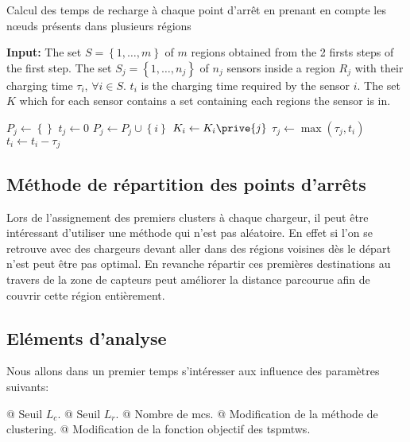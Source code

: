 \documentclass[final]{polytech/polytech}
\begin{document}
			\begin{algorithm}[H]
				\caption{Calcul des temps de recharge à chaque point d'arrêt en prenant en compte les n\oe uds présents dans plusieurs régions}
  				\label{alg:algorithm1}
  				\hspace*{\algorithmicindent} \textbf{Input:}
  				The set $S=\left\{1,\dots, m\right\}$ of $m$ regions obtained from the 2 firsts steps of the first step. The set $S_j=\left\{1,\dots ,n_j\right\}$ of $n_j$ sensors inside a region $R_j$ with their charging time $\tau_i$, $\forall i\in S$. $t_i$ is the charging time required by the sensor $i$. The set $K$ which for each sensor contains a set containing each regions the sensor is in.
				\begin{algorithmic}[1]
						\State $P_j\leftarrow \left\{\right\}$
						\State $t_j\leftarrow 0$
								\State $P_j\leftarrow P_j\cup\left\{ i\right\}$
								\State $K_i \leftarrow K_i\prive{j}$
							\Else
								\State $\tau_j \leftarrow \max\left( \tau_j, t_i\right)$
							\EndIf
						\EndFor
							\State $t_i\leftarrow t_i - \tau_j$
						\EndFor
					\EndFor
				\end{algorithmic}
			\end{algorithm}
			 

		\subsection{Méthode de répartition des points d'arrêts}
			Lors de l'assignement des premiers clusters à chaque chargeur, il peut être intéressant d'utiliser une méthode qui n'est pas aléatoire.
			En effet si l'on se retrouve avec des chargeurs devant aller dans des régions voisines dès le départ n'est peut être pas optimal.
			En revanche répartir ces premières destinations au travers de la zone de capteurs peut améliorer la distance parcourue afin de couvrir cette région entièrement.
		
		\subsection{Eléments d'analyse}
			Nous allons dans un premier temps s'intéresser aux influence des paramètres suivants:
			\begin{easylist}
				@ Seuil $L_c$.
				@ Seuil $L_r$.
				@ Nombre de \glspl{mc}.
				@ Modification de la méthode de clustering.
				@ Modification de la fonction objectif des \glspl{tspmtw}.
			\end{easylist}
			
\end{document}
